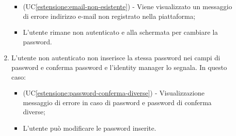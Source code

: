 \begin{itemize}
\begin{enumerate}[label=\lett]
		\begin{itemize}
			\item (UC\ref{estensione:email-non-esistente}) - Viene visualizzato un messaggio di errore indirizzo e-mail non registrato nella piattaforma;
			\item L'utente rimane non autenticato e alla schermata per cambiare la password.
		\end{itemize}
		\item L'utente non autenticato non inserisce la stessa password nei campi di password e conferma password e l'identity manager lo segnala. In questo caso:
		\begin{itemize}
			\item (UC\ref{estensione:password-conferma-diverse}) - Visualizzazione messaggio di errore in caso di password e password di conferma diverse;
			\item L'utente può modificare le password inserite.
		\end{itemize}
	\end{enumerate}
\end{itemize}

\label{password-dimenticata.email}

